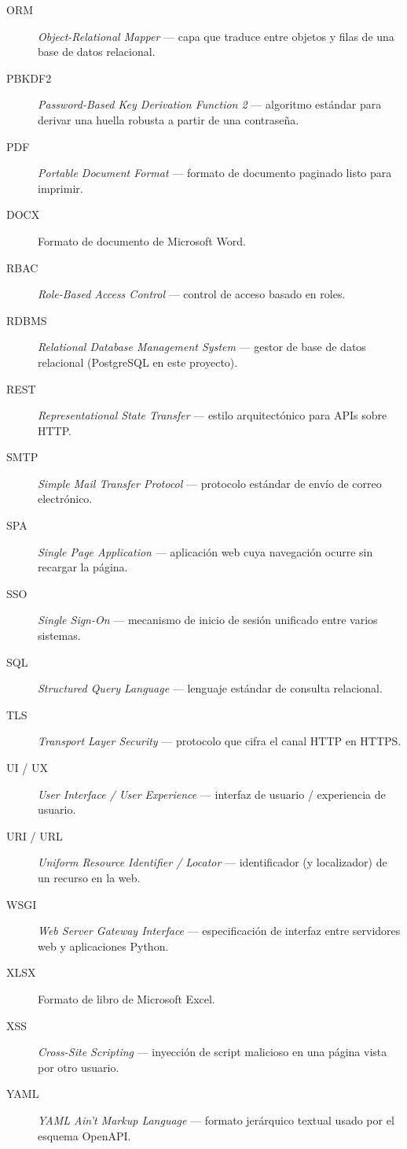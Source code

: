 \begin{description}
    \item[ORM] \emph{Object-Relational Mapper} --- capa que traduce entre objetos y filas de una base de datos relacional.
    \item[PBKDF2] \emph{Password-Based Key Derivation Function 2} --- algoritmo estándar para derivar una huella robusta a partir de una contraseña.
    \item[PDF] \emph{Portable Document Format} --- formato de documento paginado listo para imprimir.
    \item[DOCX] Formato de documento de Microsoft Word.
    \item[RBAC] \emph{Role-Based Access Control} --- control de acceso basado en roles.
    \item[RDBMS] \emph{Relational Database Management System} --- gestor de base de datos relacional (PostgreSQL en este proyecto).
    \item[REST] \emph{Representational State Transfer} --- estilo arquitectónico para APIs sobre HTTP.
    \item[SMTP] \emph{Simple Mail Transfer Protocol} --- protocolo estándar de envío de correo electrónico.
    \item[SPA] \emph{Single Page Application} --- aplicación web cuya navegación ocurre sin recargar la página.
    \item[SSO] \emph{Single Sign-On} --- mecanismo de inicio de sesión unificado entre varios sistemas.
    \item[SQL] \emph{Structured Query Language} --- lenguaje estándar de consulta relacional.
    \item[TLS] \emph{Transport Layer Security} --- protocolo que cifra el canal HTTP en HTTPS.
    \item[UI / UX] \emph{User Interface / User Experience} --- interfaz de usuario / experiencia de usuario.
    \item[URI / URL] \emph{Uniform Resource Identifier / Locator} --- identificador (y localizador) de un recurso en la web.
    \item[WSGI] \emph{Web Server Gateway Interface} --- especificación de interfaz entre servidores web y aplicaciones Python.
    \item[XLSX] Formato de libro de Microsoft Excel.
    \item[XSS] \emph{Cross-Site Scripting} --- inyección de script malicioso en una página vista por otro usuario.
    \item[YAML] \emph{YAML Ain't Markup Language} --- formato jerárquico textual usado por el esquema OpenAPI.
\end{description}

\newpage
